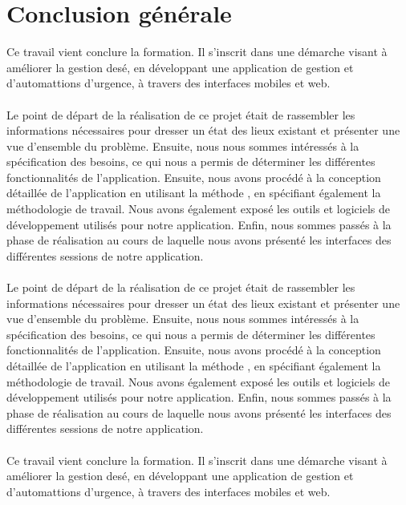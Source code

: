 \clearpage
\vspace{.5cm}
\chapter*{Conclusion générale}
Ce travail vient conclure la formation. Il s'inscrit dans une démarche visant à améliorer la gestion desé, en développant une application de gestion et d'automattions d'urgence, à travers des interfaces mobiles et web.\\\\

Le point de départ de la réalisation de ce projet était de rassembler les informations nécessaires pour dresser un état des lieux existant et présenter une vue d'ensemble du problème. Ensuite, nous nous sommes intéressés à la spécification des besoins, ce qui nous a permis de déterminer les différentes fonctionnalités de l'application. Ensuite, nous avons procédé à la conception détaillée de l'application en utilisant la méthode , en spécifiant également la méthodologie de travail. Nous avons également exposé les outils et logiciels de développement utilisés pour notre application. Enfin, nous sommes passés à la phase de réalisation au cours de laquelle nous avons présenté les interfaces des différentes sessions de notre application.\\\\

Le point de départ de la réalisation de ce projet était de rassembler les informations nécessaires pour dresser un état des lieux existant et présenter une vue d'ensemble du problème. Ensuite, nous nous sommes intéressés à la spécification des besoins, ce qui nous a permis de déterminer les différentes fonctionnalités de l'application. Ensuite, nous avons procédé à la conception détaillée de l'application en utilisant la méthode , en spécifiant également la méthodologie de travail. Nous avons également exposé les outils et logiciels de développement utilisés pour notre application. Enfin, nous sommes passés à la phase de réalisation au cours de laquelle nous avons présenté les interfaces des différentes sessions de notre application.\\\\

Ce travail vient conclure la formation. Il s'inscrit dans une démarche visant à améliorer la gestion desé, en développant une application de gestion et d'automattions d'urgence, à travers des interfaces mobiles et web.\\\\
